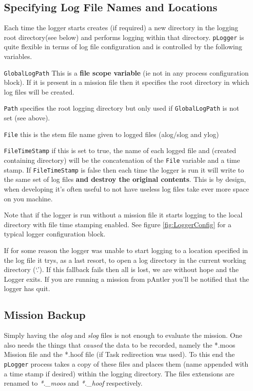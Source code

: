 \documentclass[a4paper,10pt]{article}
\newcommand{\Code}[1]{\texttt{#1} }
\newcommand{\code}[1]{\Code{#1} }
\begin{document}
\subsection{Specifying Log File Names and Locations}\label{Sec:Places}

Each time the logger starts creates (if required) a new directory in the logging root directory(see below) and performs logging within that directory. \code{pLogger} is quite flexible in terms of log file configuration and is controlled by the following variables.

\begin{description}
\item{\code{GlobalLogPath}} This is a {\textbf{file scope variable}} (ie not in any process configuration block). If it is present in a mission file then it specifies the root directory in which log files will be created.
\item{\code{Path}} specifies the root logging directory but only used if \code{GlobalLogPath} is not set (see above).
\item{\code{File}} this is the stem file name given to logged files (alog/slog and ylog)
\item{\code{FileTimeStamp}} if this is set to true, the name of  each logged file and (created containing directory) will be the concatenation of the \code{File} variable and a time stamp. If \code{FileTimeStamp} is false then each time the logger is run it will write to the same set of log files {\textbf{and destroy the original contents}}. This is by design, when developing it's often useful to not have useless log files take ever more space on you machine.
\end{description}

Note that if the logger is run without a mission file it starts logging to the local directory with file time stamping enabled. See figure \ref{fig:LoggerConfig} for a typical logger configuration block.

If for some reason the logger was unable to start logging to a location specified in the log file it trys, as a last resort, to open a log directory in the current working directory (`.'). If this fallback fails then all is lost, we are without hope and the Logger exits. If you are running a mission from pAntler you'll be notified that the logger has quit.



\subsection{Mission Backup}
Simply having the {\it{alog}} and {\it{slog}} files is not enough
to evaluate the mission. One also needs the things that
{\em{caused}} the data to be recorded, namely the *.moos Mission
file and the *.hoof file (if Task redirection was used). To this
end the \code{pLogger} process takes a copy of these files and
places them (name appended with a time stamp if desired) within
the logging directory. The files extensions are renamed to
{\it{*.\_moos}} and {\it{*.\_hoof}} respectively.
\end{document}
